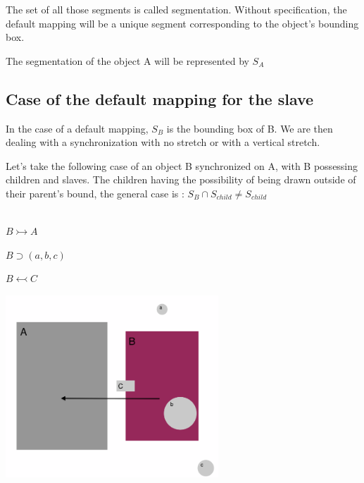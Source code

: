 \documentclass[a4paper]{article}
\begin{document}
The set of all those segments is called segmentation. Without specification, the default mapping will be a unique segment corresponding to the object's bounding box.

\bigskip

The segmentation of the object A will be represented by $S_A$


\subsection{Case of the default mapping for the slave}\label{subsec:defaultMap}

In the case of a default mapping, $S_B$ is the bounding box of B. We are then dealing with a synchronization with no stretch or with a vertical stretch. 

Let's take the following case of an object B synchronized on A, with B possessing children and slaves. 
The children having the possibility of being drawn outside of their parent's bound, the general case is : $S_B \cap S_{child} \neq S_{child}$

\bigskip

\begin{multicols}{2}

\\

 $B \rightarrowtail A$

 $B \supset (a, b, c)$

 $B \leftarrowtail C$

\columnbreak

\includegraphics[width=8cm]{img/exemple.png}   	            

\end{multicols}
\end{document}
